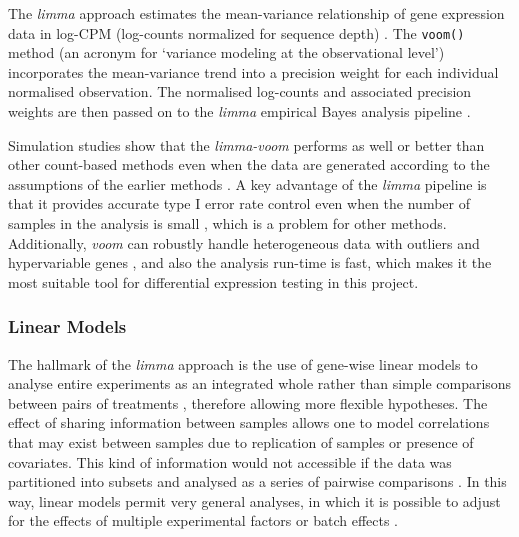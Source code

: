         The \textit{limma} approach estimates the mean-variance relationship of gene expression data in log-CPM  (log-counts normalized for sequence depth) \cite{Law2014}. The \texttt{voom()} method (an acronym for ‘variance modeling at the observational level’) incorporates the mean-variance trend into a precision weight for each individual normalised observation. The normalised log-counts and associated precision weights are then passed on to the \textit{limma} empirical Bayes analysis pipeline \cite{Law2014}.
        
        Simulation studies show that the \textit{limma-voom} performs as well or better than other count-based methods even when the data are generated according to the assumptions of the earlier methods  \cite{Law2014}. A key advantage of the \textit{limma} pipeline is that it provides accurate type I error rate control even when the number of samples in the analysis is small \cite{SmythLimma:Guide}, which is a problem for other methods. Additionally, \textit{voom} can robustly handle heterogeneous data with outliers and hypervariable genes \cite{phipson2013empirical}, and also the analysis run-time is fast, which makes it the most suitable tool for differential expression testing in this project. 
        
        \subsubsection{Linear Models}
        
        The hallmark of the \textit{limma} approach is the use of gene-wise linear models to analyse entire experiments as an integrated whole rather than simple comparisons between pairs of treatments  \cite{Ritchie2015LimmaStudies}, therefore allowing more flexible hypotheses. The effect of sharing information between samples allows one to model correlations that may exist between samples due to replication of samples or presence of covariates. This kind of information would not accessible if the data was partitioned into subsets and analysed as a series of pairwise comparisons \cite{Love2016RNA-SeqApproved}. In this way, linear models permit very general analyses, in which it is possible to adjust for the effects of multiple experimental factors or batch effects  \cite{Ritchie2015LimmaStudies}.
        
